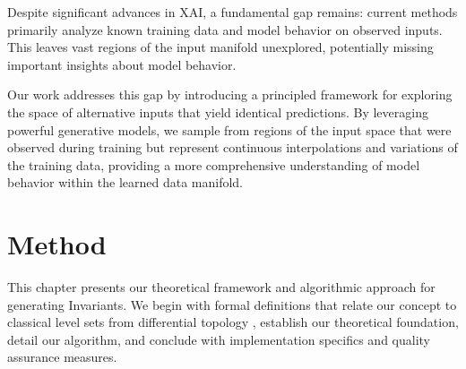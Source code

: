 \documentclass[licencjacka,en]{pracamgr}
\newcommand{\invariantimages}[1]{Invariants}  %
\begin{document}
Despite significant advances in XAI, a fundamental gap remains: current methods primarily analyze known training data and model behavior on observed inputs. This leaves vast regions of the input manifold unexplored, potentially missing important insights about model behavior.

Our work addresses this gap by introducing a principled framework for exploring the space of alternative inputs that yield identical predictions. By leveraging powerful generative models, we sample from regions of the input space that were observed during training but represent continuous interpolations and variations of the training data, providing a more comprehensive understanding of model behavior within the learned data manifold.
\chapter{Method}\label{r:method}

This chapter presents our theoretical framework and algorithmic approach for generating \invariantimages{}. We begin with formal definitions that relate our concept to classical level sets from differential topology \cite{lee2013smooth, milnor1965topology, fort2017gaussian
}, establish our theoretical foundation, detail our algorithm, and conclude with implementation specifics and quality assurance measures.
\end{document}
